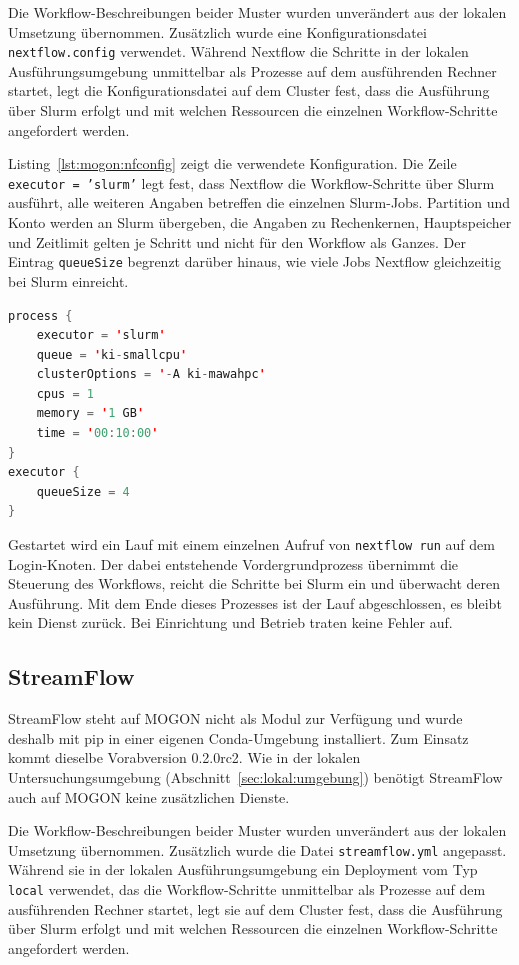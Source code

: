 Die Workflow-Beschreibungen beider Muster wurden unverändert aus der lokalen Umsetzung übernommen. Zusätzlich wurde eine Konfigurationsdatei
\texttt{nextflow.config} verwendet.
Während Nextflow die Schritte in der lokalen Ausführungsumgebung unmittelbar als Prozesse auf dem ausführenden Rechner startet, legt die Konfigurationsdatei auf dem Cluster fest, dass die Ausführung über Slurm erfolgt und mit welchen Ressourcen die einzelnen Workflow-Schritte angefordert werden.

Listing~\ref{lst:mogon:nfconfig} zeigt die verwendete
Konfiguration. Die Zeile \texttt{executor = 'slurm'} legt fest, dass Nextflow die Workflow-Schritte über Slurm ausführt, alle weiteren Angaben betreffen die einzelnen Slurm-Jobs. Partition und Konto werden an Slurm übergeben, die
Angaben zu Rechenkernen, Hauptspeicher und Zeitlimit gelten je
Schritt und nicht für den Workflow als Ganzes. Der Eintrag
\texttt{queueSize} begrenzt darüber hinaus, wie viele Jobs Nextflow
gleichzeitig bei Slurm einreicht. 

\begin{lstlisting}[language=Java,
  caption={Konfiguration von Nextflow für die Ausführung auf MOGON},
  label={lst:mogon:nfconfig}]
process {
    executor = 'slurm'
    queue = 'ki-smallcpu'
    clusterOptions = '-A ki-mawahpc'
    cpus = 1
    memory = '1 GB'
    time = '00:10:00'
}
executor {
    queueSize = 4
}
\end{lstlisting}

Gestartet wird ein Lauf mit einem einzelnen Aufruf von
\texttt{nextflow run} auf dem Login-Knoten. Der dabei entstehende
Vordergrundprozess übernimmt die Steuerung des Workflows, reicht die
Schritte bei Slurm ein und überwacht deren Ausführung. Mit dem Ende
dieses Prozesses ist der Lauf abgeschlossen, es bleibt kein Dienst
zurück. Bei Einrichtung und Betrieb traten keine Fehler auf.


\subsection{StreamFlow}
\label{sec:mogon:streamflow}

StreamFlow steht auf MOGON nicht als Modul zur Verfügung und wurde
deshalb mit pip in einer eigenen Conda-Umgebung installiert. Zum
Einsatz kommt dieselbe Vorabversion 0.2.0rc2. Wie in der lokalen
Untersuchungsumgebung (Abschnitt~\ref{sec:lokal:umgebung}) benötigt
StreamFlow auch auf MOGON keine zusätzlichen Dienste.

Die Workflow-Beschreibungen beider Muster wurden unverändert aus der 
lokalen Umsetzung übernommen. Zusätzlich wurde die Datei \texttt{streamflow.yml} angepasst. Während sie in der lokalen Ausführungsumgebung ein Deployment vom Typ \texttt{local} verwendet,
das die Workflow-Schritte unmittelbar als Prozesse auf dem ausführenden Rechner startet, legt sie auf dem Cluster fest, dass die Ausführung über Slurm erfolgt und mit welchen Ressourcen die einzelnen Workflow-Schritte angefordert werden.

